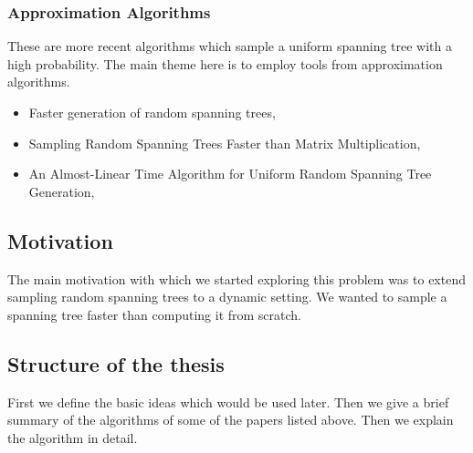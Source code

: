 \subsubsection{Approximation Algorithms}
These are more recent algorithms which sample a uniform spanning tree with a high probability. The main theme here is to employ tools from approximation algorithms. 
\begin{itemize}
\item Faster generation of random spanning trees, \cite{10.5555/1747597.1748019}
\item Sampling Random Spanning Trees Faster than Matrix Multiplication, \cite{10.1145/3055399.3055499}
\item An Almost-Linear Time Algorithm for Uniform Random Spanning Tree Generation, \cite{10.1145/3188745.3188852}
\end{itemize}

\subsection{Motivation}

The main motivation with which we started exploring this problem was to extend sampling random spanning trees to a dynamic setting. We wanted to sample a spanning tree faster than computing it from scratch. 

\subsection{Structure of the thesis}

First we define the basic ideas which would be used later. Then we give a brief summary of the algorithms of some of the papers listed above. Then we explain the \citet{harvey2016generating} algorithm in detail.



